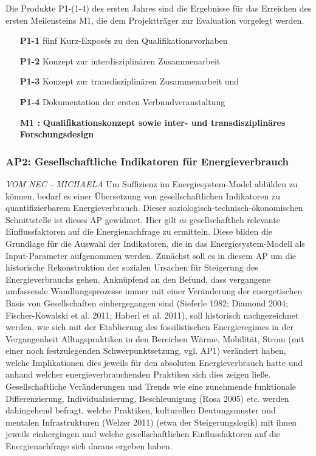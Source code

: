 \documentclass[a4paper,11pt,twoside]{scrartcl}
\begin{document}
Die Produkte P1-(1-4) des ersten Jahres sind die Ergebnisse für das Erreichen des ersten Meilensteins M1, die dem Projektträger zur Evaluation vorgelegt werden.
\begin{itemize}
    \item[\textbf{P1-1}] fünf Kurz-Exposés zu den Qualifikationsvorhaben 
    \item[\textbf{P1-2}] Konzept zur interdisziplinären Zusammenarbeit
    \item[\textbf{P1-3}] Konzept zur transdisziplinären Zusammenarbeit und
    \item[\textbf{P1-4}] Dokumentation der ersten Verbundveranstaltung
    \item[\textbf{M1 :}] \textbf{Qualifikationskonzept sowie inter- und transdisziplinäres Forschungsdesign}
\end{itemize}

\subsubsection*{AP2: Gesellschaftliche Indikatoren für Energieverbrauch}
\textit{VOM NEC - MICHAELA}
Um Suffizienz im Energiesystem-Model abbilden zu können, bedarf es einer Übersetzung von gesellschaftlichen Indikatoren zu quantifizierbarem Energieverbrauch. Dieser soziologisch-technisch-ökonomischen Schnittstelle ist dieses AP gewidmet. Hier gilt es gesellschaftlich relevante Einflussfaktoren auf die Energienachfrage zu ermitteln. Diese bilden die Grundlage für die Auswahl der Indikatoren, die in das Energiesystem-Modell als Input-Parameter aufgenommen werden. Zunächst soll es in diesem AP um die historische Rekonstruktion der sozialen Ursachen für Steigerung des Energieverbrauchs gehen. Anknüpfend an den Befund, dass vergangene umfassende Wandlungsprozesse immer mit einer Veränderung der energetischen Basis von Gesellschaften einhergegangen sind (Sieferle 1982; Diamond 2004; Fischer-Kowalski et al. 2011; Haberl et al. 2011), soll historisch nachgezeichnet werden, wie sich mit der Etablierung des fossilistischen Energieregimes in der Vergangenheit Alltagspraktiken in den Bereichen Wärme, Mobilität, Strom (mit einer noch festzulegenden Schwerpunktsetzung, vgl. AP1) verändert haben, welche Implikationen dies jeweils für den absoluten Energieverbrauch hatte und anhand welcher energieverbrauchenden Praktiken sich dies zeigen ließe. Gesellschaftliche Veränderungen und Trends wie eine zunehmende funktionale Differenzierung, Individualisierung, Beschleunigung (Rosa 2005) etc. werden dahingehend befragt, welche Praktiken, kulturellen Deutungsmuster und mentalen Infrastrukturen (Welzer 2011) (etwa der Steigerungslogik) mit ihnen jeweils einhergingen und welche gesellschaftlichen Einflussfaktoren auf die Energienachfrage sich daraus ergeben haben.
\end{document}
